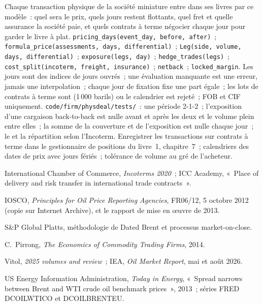 \begin{build}
 Chaque transaction physique de la société miniature entre dans ses livres
par ce modèle~: quel sera le prix, quels jours restent flottants, quel fret et quelle assurance
la société paie, et quels contrats à terme négocier chaque jour pour garder le livre à plat.
 \texttt{pricing\_days(event\_day, before, after)}~;
\texttt{formula\_price(assessments, days, differential)}~; \texttt{Leg(side, volume,
days, differential)}~; \texttt{exposure(legs, day)}~; \texttt{hedge\_trades(legs)}~;
\texttt{cost\_split(incoterm, freight, insurance)}~; \texttt{netback}~;
\texttt{locked\_margin}.
 Les jours sont des indices de jours ouvrés~; une évaluation manquante est une erreur, jamais
une interpolation~; chaque jour de fixation fixe une part égale~; les lots de contrats à terme sont
(1\,000 barils) ou le calendrier est rejeté~; FOB et CIF uniquement.
 \texttt{code/firm/physdeal/tests/}~: une période 2-1-2~;
l'exposition d'une cargaison back-to-back est nulle avant et après les deux  et
le volume plein entre elles~; la somme de la couverture et de l'exposition est nulle chaque jour~; le  et
la répartition selon l'Incoterm.
 Enregistrer les transactions sur contrats à terme dans le gestionnaire de positions du livre~1,
chapitre~7~; calendriers des dates de prix avec jours fériés~; tolérance de volume au
gré de l'acheteur.
\end{build}

\begin{omsources}
\item International Chamber of Commerce, \emph{Incoterms 2020}~; ICC Academy, «~Place
of delivery and risk transfer in international trade contracts~».
\item IOSCO, \emph{Principles for Oil Price Reporting Agencies}, FR06/12, 5 octobre 2012
(copie sur Internet Archive), et le rapport de mise en œuvre de 2013.
\item S\&P Global Platts, méthodologie de Dated Brent et processus market-on-close.
\item C.~Pirrong, \emph{The Economics of Commodity Trading Firms}, 2014.
\item Vitol, \emph{2025 volumes and review}~; IEA, \emph{Oil Market Report}, mai et
août 2026.
\item US Energy Information Administration, \emph{Today in Energy}, «~Spread narrows
between Brent and WTI crude oil benchmark prices~», 2013~; séries FRED DCOILWTICO et
DCOILBRENTEU.
\end{omsources}

